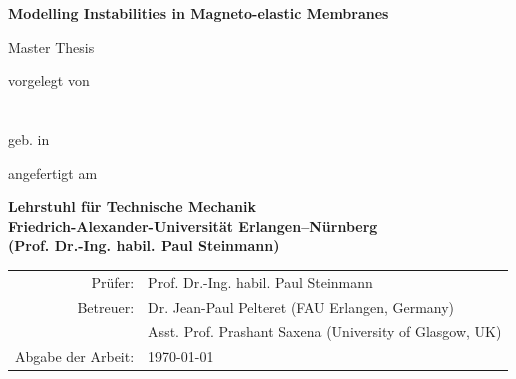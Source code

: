 \documentclass[a4paper,12pt,BCOR0mm,headsepline,final,twoside]{scrbook}
\newcommand{\thethesis}[0]{%
  Master Thesis
}
\newcommand{\field}[1]{%
  {\itshape \{#1\}}
}
\begin{document}
\frontmatter
\begin{titlepage}

  \begin{center}
    
    {\Large \bf
      \textbf{Modelling Instabilities in Magneto-elastic Membranes}\\
    } 
    
    \vspace*{1cm}
    \large{\thethesis} %
    \vspace{1cm}
    
    {\large vorgelegt von} \\
    \vspace*{0.7cm}
    {\Large \bf {}} \\
    \vspace*{0.7cm}
    {\large \bf {}} \\
    \vspace*{0.7cm}
    {\large geb.  in } 
    
    \vspace{1.5cm}
    
    angefertigt am 

    \vspace{0.5cm}
    
    {\bf 
      Lehrstuhl f\"ur Technische Mechanik\\
      Friedrich-Alexander-Universit\"at Erlangen--N\"urnberg \\
      (Prof. Dr.-Ing. habil. Paul Steinmann)
      }
    
    \vspace{1cm}
    \begin{tabular}{rl}
    Pr\"ufer:& Prof. Dr.-Ing. habil. Paul Steinmann \vspace{1cm} \\
    
    
    Betreuer:& Dr. Jean-Paul Pelteret (FAU Erlangen, Germany)\\
    		 & Asst. Prof. Prashant Saxena (University of Glasgow, UK) \vspace{1cm} \\    
    
    Abgabe der Arbeit:& \today
    \end{tabular}
    

\end{center}
\end{titlepage}
\end{document}
